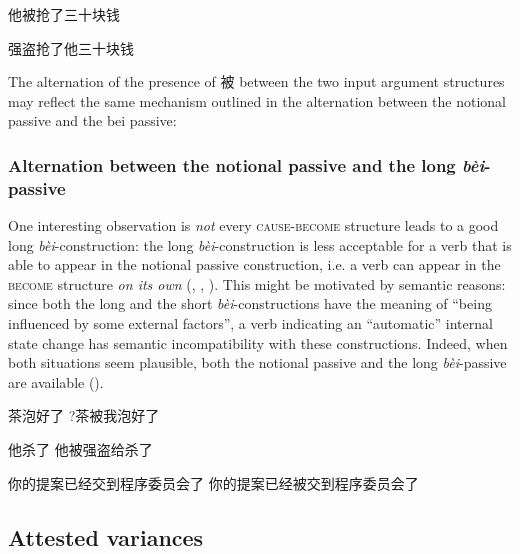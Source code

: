 \documentclass[UTF8, a4paper, oneside, scheme=plain, 12pt]{ctexrep}
\newcommand{\form}[1]{\emph{#1}}
\newcommand*{\category}[1]{\textsc{#1}}
\begin{document}
他被抢了三十块钱 

强盗抢了他三十块钱

The alternation of the presence of 被 between the two input argument structures 
may reflect the same mechanism outlined in the alternation 
between the notional passive and the bei passive:

\subsubsection{Alternation between the notional passive and the long \form{bèi}-passive}
\label{sec:verb-phrase.bei.passive-alternation}

One interesting observation is \emph{not} every \category{cause}-\category{become} structure 
leads to a good long \form{bèi}-construction: 
the long \form{bèi}-construction
is less acceptable for 
a verb that is able to appear in the notional passive construction,
i.e. a verb can appear in the \category{become} structure \emph{on its own}
(,
,
).
This might be motivated by semantic reasons:
since both the long and the short \form{bèi}-constructions 
have the meaning of ``being influenced by some external factors'',
a verb indicating an ``automatic'' internal state change 
has semantic incompatibility with these constructions. 
Indeed, when both situations seem plausible, 
both the notional passive and the long \form{bèi}-passive 
are available ().

\begin{exe}
    \ex\label{ex:verb-phrase.bei.notional-pass-conflict-1} \begin{xlist}
        \ex 茶泡好了
        \ex ?茶被我泡好了
    \end{xlist}
    \ex\label{ex:verb-phrase.bei.notional-pass-conflict-2} \begin{xlist}
        \ex *他杀了
        \ex 他被强盗给杀了
    \end{xlist}
    \ex\label{ex:verb-phrase.bei.notional-pass-conflict-3} \begin{xlist}
        \ex 你的提案已经交到程序委员会了
        \ex 你的提案已经被交到程序委员会了
    \end{xlist}
\end{exe}

\subsection{Attested variances}
\end{document}
